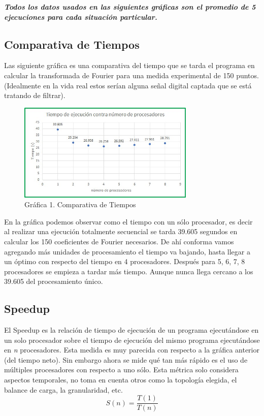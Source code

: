 \documentclass{report}
\begin{document}
\noindent \textbf{\textit{Todos los datos usados en las siguientes gráficas son el promedio de 5 ejecuciones para cada situación particular.}}

\subsection*{Comparativa de Tiempos}
\noindent Las siguiente gráfica es una comparativa del tiempo que se tarda el programa en calcular la transformada de Fourier para una medida experimental de 150 puntos. (Idealmente en la vida real estos serían alguna señal digital captada que se está tratando de filtrar).

\vspace{0.7cm}

\begin{figure}[h!]
    \centering
    \includegraphics[width = 0.75\textwidth]{Images/tiempo.jpeg}
    \caption{Gráfica 1. Comparativa de Tiempos}
\end{figure}

En la gráfica podemos observar como el tiempo con un sólo procesador, es decir al realizar una ejecución totalmente secuencial se tarda 39.605 segundos en calcular los 150 coeficientes de Fourier necesarios. De ahí conforma vamos agregando más unidades de procesamiento el tiempo va bajando, hasta llegar a un óptimo con respecto del tiempo en 4 procesadores. Después para 5, 6, 7, 8 procesadores se empieza a tardar más tiempo. Aunque nunca llega cercano a los 39.605 del procesamiento único.

\clearpage
\subsection*{Speedup}
\noindent El Speedup es la relación de tiempo de ejecución de un programa ejecutándose en un solo procesador sobre el tiempo de ejecución del mismo programa ejecutándose en \textit{n} procesadores. Esta medida es muy parecida con respecto a la gráfica anterior (del tiempo neto). Sin embargo ahora se mide qué tan más rápido es el uso de múltiples procesadores con respecto a uno sólo. Esta métrica solo considera aspectos temporales, no toma en cuenta otros como la topología elegida, el balance de carga, la granularidad, etc.\medskip
\begin{equation*}
    S(n) = \frac{T(1)}{T(n)}
\end{equation*}
\end{document}
